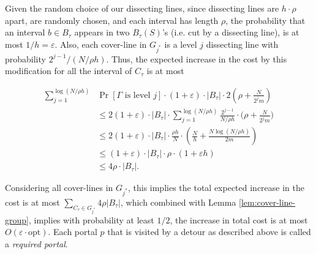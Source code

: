 \documentclass[pdflatex,sn-mathphys-num]{sn-jnl}
\theoremstyle{thmstyleone}
\newcommand{\eps}{\varepsilon}
\newcommand{\opt}{{\text{opt}}}
\begin{document}
Given the random choice of our dissecting lines, since dissecting lines are $h\cdot\rho$ apart, are randomly chosen, and each interval has length $\rho$, the probability that an interval $b\in B_\tau$ appears in two $B_\tau(S)$'s (i.e. cut by a dissecting line), is at most $1/{h}=\eps$. Also, each cover-line in $G_{j^*}$ is a level $j$ dissecting line with probability $2^{j-1}/(N/\rho h)$.
Thus, the expected increase in the cost by this modification for all the
interval of $C_\tau$ is at most

\begin{align*}
    \sum_{j=1}^{\log (N/\rho h)}& \Pr[\mbox{$\Gamma$ is level $j$}]\cdot (1+\eps)\cdot|B_\tau|\cdot 2(\rho+\frac{N}{2^jm})\\
    &\le  2(1+\eps)\cdot|B_\tau|\cdot\sum_{j=1}^{\log(N/\rho h)} \frac{2^{j-1}}{N/\rho h}\cdot\left.(\rho+\frac{N}{2^j m}\right.)\\
    &\le  2(1+\eps)\cdot |B_\tau|\cdot \frac{\rho h}{N} \cdot \left(\frac{N}{h}+\frac{N\log(N/\rho h)}{2m}\right)\\
    &\le  (1+\eps)\cdot|B_\tau|\cdot\rho\cdot(1+\eps h)\\
    &\leq 4\rho\cdot|B_\tau|.
\end{align*}


Considering all cover-lines in $G_{j^*}$, this implies the total expected increase
in the cost is at most $\sum_{C_\tau\in G_{j^*}} 4\rho|B_\tau|$, which combined with Lemma 
\ref{lem:cover-line-group}, implies with probability at least $1/2$, the increase in total cost is at most $O(\eps\cdot\opt)$. Each portal $p$ that is visited by a detour as described above is called a {\em required portal}. 
\end{document}
